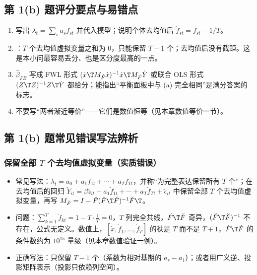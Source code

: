 \subsection{第 1(b) 题评分要点与易错点}

\begin{note}[1(b) 评分要点与易错点]
\begin{enumerate}
  \item 写出 $\lambda_t=\sum_sa_sf_{st}$ 并代入模型；说明个体去均值后 $\dot f_{st}=f_{st}-1/T$。
  \item {}：$T$ 个去均值虚拟变量之和为 0，只能保留 $T-1$ 个；去均值后没有截距。这是本小问最容易丢分、也是区分度最高的一点。
  \item $\hat\beta_{FE}$ 写成 FWL 形式 $(\dot x\T M_{\dot F}\dot x)^{-1}\dot x\T M_{\dot F}\dot Y$ 或联合 OLS 形式 $(Z\T Z)^{-1}Z\T\dot Y$ 都给分；能指出“平衡面板中与 (a) 完全相同”是满分答案的标志。
  \item 不要写“两者渐近等价”——它们是数值恒等（见本章数值等价一节）。
\end{enumerate}
\end{note}

\subsection{第 1(b) 题常见错误写法辨析}

\subsubsection{保留全部 \texorpdfstring{$T$}{T} 个去均值虚拟变量（实质错误）}
\begin{itemize}
  \item 常见写法：$\lambda_t=a_0+a_1f_{1t}+\cdots+a_Tf_{Tt}$，并称“为完整表达保留所有 $T$ 个”；在去均值后的回归 $\breve Y_{it}=\beta\breve z_{it}+a_1\breve f_{1t}+\cdots+a_T\breve f_{Tt}+\breve\epsilon_{it}$ 中保留全部 $T$ 个去均值虚拟变量，再写 $M_{\breve F}=I-\breve F(\breve F\T\breve F)^{-1}\breve F\T$。
  \item 问题：$\sum_{k=1}^T\breve f_{kt}=1-T\cdot\frac1T=0$，$T$ 列完全共线，$\breve F\T\breve F$ 奇异，$(\breve F\T\breve F)^{-1}$ 不存在，公式无定义。数值上，$[\dot x,\dot f_1,\dots,\dot f_T]$ 的秩是 $T$ 而不是 $T+1$，$\dot F\T\dot F$ 的条件数约为 $10^{15}$ 量级（见本章数值验证一例）。
  \item 正确写法：只保留 $T-1$ 个（系数为相对基期的 $a_s-a_1$）；或者用广义逆、投影矩阵表示（投影只依赖列空间）。
\end{itemize}


